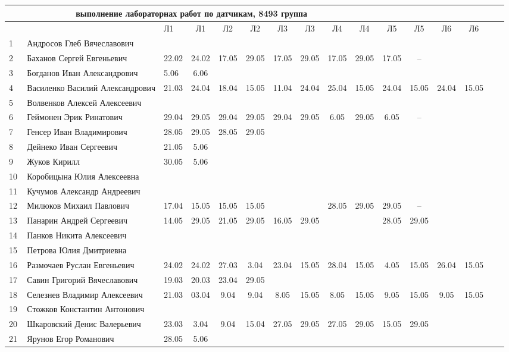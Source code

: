 \newpage
%
\begin{tabular}{l|llccccccccccccc}
\multicolumn{10}{c}{выполнение лабораторнах работ по датчикам, 8493 группа} \\
\toprule
&&Л1&Л1& Л2&Л2& Л3&Л3& Л4&Л4 &Л5&Л5& Л6&Л6\\
\midrule
1\,&  Андросов Глеб Вячеславович      &      &      &&&&&&\\
2\,&  Баханов Сергей Евгеньевич       & 22.02& 24.02&17.05&29.05& 17.05&29.05& 17.05& 29.05& 17.05 & -- \\
3\,&  Богданов Иван Александрович     &  5.06&  6.06&&&&&&\\
4\,&  Василенко Василий Александрович & 21.03& 24.04& 18.04& 15.05&11.04&24.04&25.04&15.05&24.04&15.05& 24.04&15.05\\
5\,&  Волвенков Алексей Алексеевич    &      &      &&&&&&\\
\midrule                                            
6\,&  Геймонен Эрик Ринатович         & 29.04 & 29.05 & 29.04 & 29.05 & 29.04 & 29.05 & 6.05 & 29.05 &6.05&--\\
7\,&  Генсер Иван Владимирович        & 28.05& 29.05&28.05& 29.05&&&&\\
8\,&  Дейнеко Иван Сергеевич          & 21.05&  5.06&&&&&&\\
9\,&  Жуков Кирилл                    & 30.05&  5.06&&&&&&\\
10\,& Коробицына Юлия Алексеевна      &      &      &&&&&&\\
\midrule                                            
11\,& Кучумов Александр Андреевич     &      &      &&&&&&\\
12\,& Милюков Михаил Павлович         &17.04 & 15.05&15.05&15.05&&&28.05&29.05&29.05&--\\
13\,& Панарин Андрей Сергеевич        &14.05 & 29.05& 21.05& 29.05 & 16.05&29.05&&&28.05&29.05\\
14\,& Панков Никита Алексеевич        &      &      &&&&&&\\
15\,& Петрова Юлия Дмитриевна         &      &      &&&&&&\\
\midrule                                            
16\,& Размочаев Руслан Евгеньевич     & 24.02& 24.02& 27.03&  3.04&23.04& 15.05& 28.04&15.05& 4.05& 15.05 & 26.04 & 15.05\\
17\,& Савин Григорий Вячеславович     & 19.03& 20.03& 23.04& 29.05&&&&\\
18\,& Селезнев Владимир Алексеевич    & 21.03& 03.04&  9.04& 9.04 & 8.05& 15.05& 8.05& 15.05 & 9.05& 15.05& 9.05& 15.05\\
19\,& Стожков Константин Антонович    &      &      &&&&&&\\
20\,& Шкаровский Денис Валерьевич     & 23.03& 3.04 & 9.04& 15.04& 27.05& 29.05 & 27.05& 29.05 & 15.05& 29.05\\
\midrule                                            
21\,& Ярунов Егор Романович           & 28.05& 5.06 &&&&&&\\
\bottomrule
\end{tabular}

